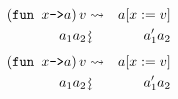 \documentclass{beamer}
\newcommand{\assign}{:=}
\newcommand{\downsquigarrow}{{\mbox{\rotatebox[origin=c]{-90}{$\rightsquigarrow$}}}}
\newcommand{\tmverbatim}[1]{\text{{\ttfamily{#1}}}}
\begin{document}
{\hlstd{ \ \ \ \ \ }}{\hlopt{\textbar }}{}{\hlopt{(}}{}{\hlopt{, }}{}{\hlopt{) -> }}{}{\hlopt{+ }}{}{\hlopt{) }}\\
{\hlopt{ \ \ \ (}}{}{\hlopt{(}}{}{}{\hlopt{->}}{\hlendline{}}\\
{\hlstd{ \ \ \ \ \ }}{}{}{}{\hlendline{}}\\
{\hlstd{ \ \ \ \ \ \ \ }}{\hlopt{\textbar }}{}{\hlopt{->
}}{}{\hlendline{}}\\
{\hlstd{ \ \ \ \ \ }}{\hlopt{ \ \textbar }}{}{\hlopt{(}}{}{\hlopt{, }}{}{\hlopt{) -> }}{}{\hlopt{+ }}{}{\hlopt{))}}\\
{\hlopt{ \ \ \ (}}{}{\hlopt{(}}{}{\hlopt{,
(}}{}{\hlopt{(}}{}{\hlopt{,
}}{}{\hlopt{))))}}
\begin{eqnarray*}
  \left( \text{\tmverbatim{fun }} x \text{\tmverbatim{->}} a \right) v &
  \rightsquigarrow & a [x \assign v]\\
  a_1 a_2 & \downsquigarrow & a_1' a_2
\end{eqnarray*}
{\newpage}
\begin{eqnarray*}
  \left( \text{\tmverbatim{fun }} x \text{\tmverbatim{->}} a \right) v &
  \rightsquigarrow & a [x \assign v]\\
  a_1 a_2 & \downsquigarrow & a_1' a_2
\end{eqnarray*}
{\hlstd{ \ }}{\hlopt{(}}{}{}{\hlopt{->}}{\hlendline{}}\\
{\hlstd{ \ \ \ }}{}{}{}{\hlendline{}}\\
{\hlstd{ \ \ \ }}{\hlopt{ \ \textbar }}{}{\hlopt{->
}}{}{\hlendline{}}\\
{\hlstd{ \ \ \ }}{\hlopt{ \ \textbar }}{}{\hlopt{(}}{}{\hlopt{, }}{}{\hlopt{) -> }}{}{\hlopt{+ }}{\hlopt{(}}{}{\hlopt{(}}{}{}{\hlopt{->}}{\hlendline{}}\\
{\hlstd{ \ \ \ \ \ \ \ }}{}{}{}{\hlendline{}}\\
{\hlstd{ \ \ \ \ \ \ \ \ \ }}{\hlopt{\textbar }}{}{\hlopt{->
}}{}{\hlendline{}}\\
{\hlstd{ \ \ \ \ \ }}{\hlopt{ \ \ \ \textbar }}{}{\hlopt{(}}{}{\hlopt{, }}{}{\hlopt{) -> }}{}{\hlopt{+ }}{}{\hlopt{))}}{}{\hlopt{) }}\\
\end{document}
